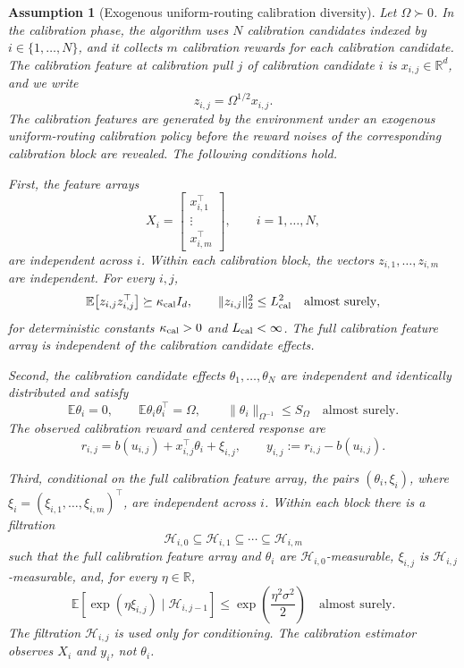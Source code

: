 \documentclass{article} %
\newtheorem{assumption}{Assumption}
\begin{document}
\begin{assumption}[Exogenous uniform-routing calibration diversity]
\label{ass:exogenous-uniform-calibration-diversity-final}
Let \(\Omega\succ0\).  In the calibration phase, the algorithm uses
\(N\) calibration candidates indexed by \(i\in\{1,\ldots,N\}\), and it collects
\(m\) calibration rewards for each calibration candidate.  The calibration
feature at calibration pull \(j\) of calibration candidate \(i\) is
\(x_{i,j}\in\mathbb{R}^d\), and we write
\[
z_{i,j}=\Omega^{1/2}x_{i,j}.
\]
The calibration features are generated by the environment under an exogenous
uniform-routing calibration policy before the reward noises of the corresponding
calibration block are revealed.  The following conditions hold.

First, the feature arrays
\[
X_i=
\begin{bmatrix}
x_{i,1}^{\top}\\
\vdots\\
x_{i,m}^{\top}
\end{bmatrix},
\qquad i=1,\ldots,N,
\]
are independent across \(i\).  Within each calibration block, the vectors
\(z_{i,1},\ldots,z_{i,m}\) are independent.  For every \(i,j\),
\[
\mathbb{E}\!\left[z_{i,j}z_{i,j}^{\top}\right]\succeq \kappa_{\rm cal} I_d,
\qquad
\|z_{i,j}\|_2^2\le L_{\rm cal}^2
\quad\text{almost surely},
\]
for deterministic constants \(\kappa_{\rm cal}>0\) and \(L_{\rm cal}<\infty\).
The full calibration feature array is independent of the calibration candidate
effects.

Second, the calibration candidate effects \(\theta_1,\ldots,\theta_N\) are
independent and identically distributed and satisfy
\[
\mathbb{E}\theta_i=0,
\qquad
\mathbb{E}\theta_i\theta_i^\top=\Omega,
\qquad
\|\theta_i\|_{\Omega^{-1}}\le S_\Omega
\quad\text{almost surely}.
\]
The observed calibration reward and centered response are
\[
r_{i,j}
=
b(u_{i,j})+x_{i,j}^\top\theta_i+\xi_{i,j},
\qquad
y_{i,j}:=r_{i,j}-b(u_{i,j}).
\]

Third, conditional on the full calibration feature array, the pairs
\((\theta_i,\xi_i)\), where
\(\xi_i=(\xi_{i,1},\ldots,\xi_{i,m})^\top\), are independent across \(i\).
Within each block there is a filtration
\[
\mathcal{H}_{i,0}\subseteq\mathcal{H}_{i,1}\subseteq\cdots\subseteq
\mathcal{H}_{i,m}
\]
such that the full calibration feature array and \(\theta_i\) are
\(\mathcal{H}_{i,0}\)-measurable, \(\xi_{i,j}\) is
\(\mathcal{H}_{i,j}\)-measurable, and, for every \(\eta\in\mathbb{R}\),
\[
\mathbb{E}\!\left[
\exp(\eta\xi_{i,j})\mid \mathcal{H}_{i,j-1}
\right]
\le
\exp\!\left(\frac{\eta^2\sigma^2}{2}\right)
\quad\text{almost surely}.
\]
The filtration \(\mathcal H_{i,j}\) is used only for conditioning. The
calibration estimator observes \(X_i\) and \(y_i\), not \(\theta_i\).
\end{assumption}
\end{document}
